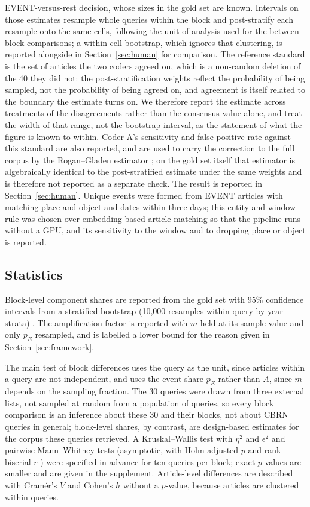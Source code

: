 \documentclass[1p,times]{elsarticle}
\begin{document}
EVENT-versus-rest decision, whose sizes in the gold set are known. Intervals on those estimates resample whole queries within the block and post-stratify each resample onto the same cells, following the unit of analysis used for the between-block comparisons; a within-cell bootstrap, which ignores that clustering, is reported alongside in Section~\ref{sec:human} for comparison. The reference standard is the set of articles the two coders agreed on, which is a non-random deletion of the 40 they did not: the post-stratification weights reflect the probability of being sampled, not the probability of being agreed on, and agreement is itself related to the boundary the estimate turns on. We therefore report the estimate across treatments of the disagreements rather than the consensus value alone, and treat the width of that range, not the bootstrap interval, as the statement of what the figure is known to within. Coder A's sensitivity and false-positive rate against this standard are also reported, and are used to carry the correction to the full corpus by the Rogan--Gladen estimator \cite{rogan1978}; on the gold set itself that estimator is algebraically identical to the post-stratified estimate under the same weights and is therefore not reported as a separate check. The result is reported in Section~\ref{sec:human}. Unique events were formed from EVENT articles with matching place and object and dates within three days; this entity-and-window rule was chosen over embedding-based article matching \cite{sen2019} so that the pipeline runs without a GPU, and its sensitivity to the window and to dropping place or object is reported.

\subsection{Statistics}
\label{sec:stats}
Block-level component shares are reported from the gold set with 95\% confidence intervals from a stratified bootstrap (10,000 resamples within query-by-year strata) \cite{efron1979}. The amplification factor is reported with $m$ held at its sample value and only $p_E$ resampled, and is labelled a lower bound for the reason given in Section~\ref{sec:framework}.

The main test of block differences uses the query as the unit, since articles within a query are not independent, and uses the event share $p_E$ rather than $A$, since $m$ depends on the sampling fraction. The 30 queries were drawn from three external lists, not sampled at random from a population of queries, so every block comparison is an inference about these 30 and their blocks, not about CBRN queries in general; block-level shares, by contrast, are design-based estimates for the corpus these queries retrieved. A Kruskal--Wallis test with $\eta^2$ and $\epsilon^2$ and pairwise Mann--Whitney tests (asymptotic, with Holm-adjusted $p$ and rank-biserial $r$ \cite{kerby2014}) were specified in advance for ten queries per block; exact $p$-values are smaller and are given in the supplement. Article-level differences are described with Cram\'er's $V$ and Cohen's $h$ without a $p$-value, because articles are clustered within queries.
\end{document}
